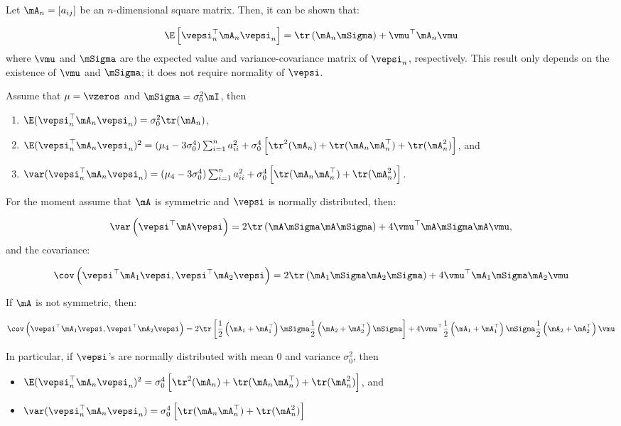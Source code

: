\begin{lemma}\label{lemma:second-mom-lee}
Let $\mA_n=\left[a_{ij}\right]$ be an $n$-dimensional square matrix. Then, it can be shown that:

\begin{equation*}
\E\left[\vepsi^\top_n\mA_n\vepsi_n\right]=\tr\left(\mA_n\mSigma\right)+\vmu^\top\mA_n\vmu
\end{equation*}
%
where $\vmu$ and $\mSigma$ are the expected value and variance-covariance matrix of $\vepsi_n$, respectively. This result only depends on the existence of $\vmu$ and $\mSigma$; it does not require normality of $\vepsi$. 

Assume that $\mu = \vzeros$ and $\mSigma = \sigma_0^2\mI$, then

\begin{enumerate}
  \item $\E(\vepsi_n^\top\mA_n\vepsi_n) = \sigma^2_0\tr(\mA_n)$,
  \item $\E(\vepsi_n^\top\mA_n\vepsi_n)^2 = (\mu_4 - 3\sigma^4_0)\sum_{i = 1}^na_{ii}^2+\sigma^4_0\left[\tr^2(\mA_n) + \tr(\mA_n\mA_n^\top)+\tr(\mA^2_n)\right]$, and
  \item $\var(\vepsi_n^\top\mA_n\vepsi_n) = (\mu_4 - 3\sigma^4_0)\sum_{i = 1}^na_{ii}^2+\sigma^4_0\left[\tr(\mA_n\mA_n^\top)+\tr(\mA^2_n)\right]$.
\end{enumerate}

For the moment assume that $\mA$ is symmetric and $\vepsi$ is normally distributed, then:

\begin{equation*}
\var\left(\vepsi^\top\mA\vepsi\right)= 2\tr\left(\mA\mSigma\mA\mSigma\right) + 4\vmu^\top\mA\mSigma\mA\vmu,
\end{equation*}
%
and the covariance:

\begin{equation*}
\cov\left(\vepsi^\top\mA_1\vepsi, \vepsi^\top\mA_2\vepsi\right)= 2\tr\left(\mA_1\mSigma\mA_2\mSigma\right) + 4\vmu^\top\mA_1\mSigma\mA_2\vmu
\end{equation*}

If $\mA$ is not symmetric, then:

\begin{equation}\label{eq:var-quadratic-form}
\cov\left(\vepsi^\top\mA_1\vepsi, \vepsi^\top\mA_2\vepsi\right)= 2\tr\left[\frac{1}{2}\left(\mA_1 + \mA_1^\top\right)\mSigma\frac{1}{2}\left(\mA_2 + \mA_2^\top\right)\mSigma\right] + 4\vmu^\top\frac{1}{2}\left(\mA_1 + \mA_1^\top\right)\mSigma\frac{1}{2}\left(\mA_2 + \mA_2^\top\right)\vmu
\end{equation}

In particular, if $\vepsi$'s are normally distributed with mean 0 and variance $\sigma_0^2$, then 

\begin{itemize}
  \item $\E(\vepsi_n^\top\mA_n\vepsi_n)^2 = \sigma^4_0\left[\tr^2(\mA_n) + \tr(\mA_n\mA_n^\top)+\tr(\mA^2_n)\right]$, and
  \item $\var(\vepsi_n^\top\mA_n\vepsi_n) = \sigma^4_0\left[\tr(\mA_n\mA_n^\top)+\tr(\mA^2_n)\right]$
\end{itemize}
\end{lemma}
